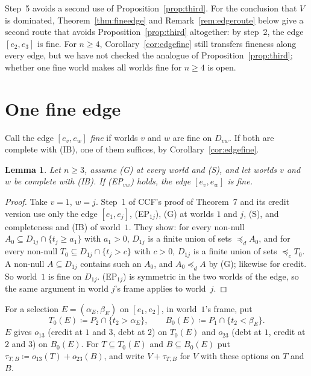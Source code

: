 \documentclass[11pt]{article}
\newtheorem{lemma}[theorem]{Lemma}
\theoremstyle{definition}\newtheorem{definition}[theorem]{Definition}
\theoremstyle{remark}\newtheorem{remark}[theorem]{Remark}
\begin{document}
\noindent Step~5 avoids a second use of Proposition~\ref{prop:third}. For
the conclusion that $V$ is dominated, Theorem~\ref{thm:fineedge} and
Remark~\ref{rem:edgeroute} below give a second route that avoids
Proposition~\ref{prop:third} altogether: by step~2, the edge $[e_2,e_3]$ is
fine. For $n\ge4$, Corollary~\ref{cor:edgefine} still
transfers fineness along every edge, but we have not checked the analogue of
Proposition~\ref{prop:third}; whether one fine world makes all worlds fine
for $n\ge4$ is open.

\section{One fine edge}\label{sec:edge}

Call the edge $[e_v,e_w]$ \emph{fine} if worlds $v$ and $w$ are fine on
$D_{vw}$. If both are complete with (IB), one of them suffices, by
Corollary~\ref{cor:edgefine}.

\begin{lemma}\label{lem:EPfine}
Let $n\ge3$, assume (G) at every world and (S), and let worlds $v$ and $w$ be
complete with (IB). If (EP$_{vw}$) holds, the edge $[e_v,e_w]$ is fine.
\end{lemma}
\begin{proof}
Take $v=1$, $w=j$. Step~1 of CCF's proof of Theorem~7 and its credit version
use only the edge $[e_1,e_j]$, (EP$_{1j}$), (G) at worlds $1$ and $j$, (S),
and completeness and (IB) of world~$1$. They show: for every non-null
$A_0\subseteq D_{1j}\cap\{t_j\ge a_1\}$ with $a_1>0$, $D_{1j}$ is a finite
union of sets $\preceq_dA_0$, and for every non-null
$T_0\subseteq D_{1j}\cap\{t_j>c\}$ with $c>0$, $D_{1j}$ is a finite union of
sets $\preceq_cT_0$. A non-null $A\subseteq D_{1j}$ contains such an $A_0$,
and $A_0\preceq_dA$ by (G); likewise for credit. So world~$1$ is fine on
$D_{1j}$. (EP$_{1j}$) is symmetric in the two worlds of the edge, so the same
argument in world $j$'s frame applies to world~$j$.
\end{proof}

For a selection $E=(\alpha_E,\beta_E)$ on $[e_1,e_2]$, in world~$1$'s frame,
put
\[
 T_0(E)\coloneqq P_2\cap\{t_2>\alpha_E\},\qquad
 B_0(E)\coloneqq P_1\cap\{t_2<\beta_E\}.
\]
$E$ gives $o_{13}$ (credit at $1$ and $3$, debt at $2$) on $T_0(E)$ and
$o_{23}$ (debt at $1$, credit at $2$ and $3$) on $B_0(E)$. For
$T\subseteq T_0(E)$ and $B\subseteq B_0(E)$ put
$\tau_{T,B}\coloneqq o_{13}(T)+o_{23}(B)$, and write $V+\tau_{T,B}$ for $V$
with these options on $T$ and $B$.
\end{document}
